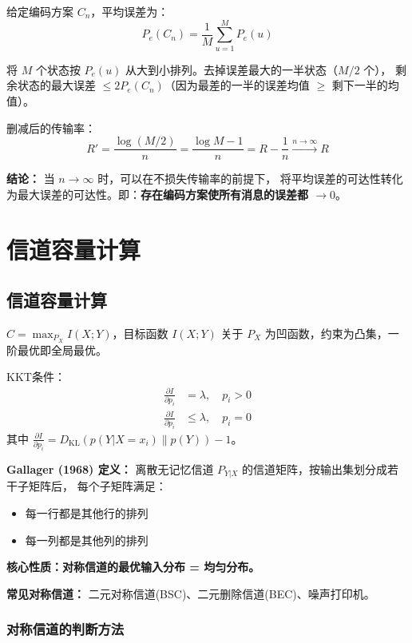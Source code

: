 \documentclass[12pt,a4paper]{ctexart}
\theoremstyle{definition}
\newcommand{\DKL}{D_{\mathrm{KL}}}
\begin{document}
给定编码方案 $C_n$，平均误差为：
\[
P_e(C_n) = \frac{1}{M}\sum_{u=1}^{M} P_e(u)
\]

将 $M$ 个状态按 $P_e(u)$ 从大到小排列。去掉误差最大的一半状态（$M/2$ 个），
剩余状态的最大误差 $\leq 2P_e(C_n)$（因为最差的一半的误差均值 $\geq$ 剩下一半的均值）。

删减后的传输率：
\[
R' = \frac{\log(M/2)}{n} = \frac{\log M - 1}{n} = R - \frac{1}{n} \xrightarrow{n\to\infty} R
\]

\textbf{结论：} 当 $n \to \infty$ 时，可以在不损失传输率的前提下，
将平均误差的可达性转化为最大误差的可达性。即：\textbf{存在编码方案使所有消息的误差都 $\to 0$}。

\section{信道容量计算}

\subsection{信道容量计算}

$C = \max_{P_X} I(X;Y)$，目标函数 $I(X;Y)$ 关于 $P_X$ 为凹函数，约束为凸集，一阶最优即全局最优。

KKT条件：
\begin{align*}
\frac{\partial I}{\partial p_i} &= \lambda, \quad p_i > 0 \\
\frac{\partial I}{\partial p_i} &\leq \lambda, \quad p_i = 0
\end{align*}
其中 $\frac{\partial I}{\partial p_i} = \DKL(p(Y|X=x_i) \| p(Y)) - 1$。

\begin{keybox}[对称信道 —— 必考]
\textbf{Gallager (1968) 定义：} 离散无记忆信道 $P_{Y|X}$ 的信道矩阵，按输出集划分成若干子矩阵后，
每个子矩阵满足：
\begin{itemize}[nosep]
  \item 每一行都是其他行的排列
  \item 每一列都是其他列的排列
\end{itemize}
\textbf{核心性质：对称信道的最优输入分布 = 均匀分布。}

\textbf{常见对称信道：} 二元对称信道(BSC)、二元删除信道(BEC)、噪声打印机。
\end{keybox}

\subsubsection{对称信道的判断方法}
\end{document}
